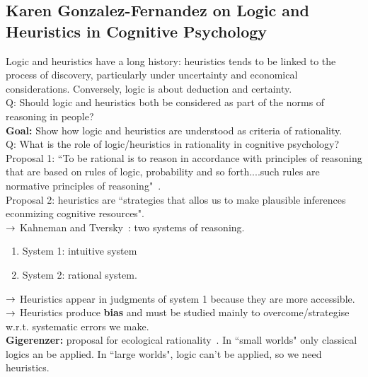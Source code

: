 \spacerule

\subsection{Karen Gonzalez-Fernandez on Logic
and Heuristics in Cognitive Psychology}

Logic and heuristics have a long history: heuristics tends to be linked to the process of discovery, particularly under uncertainty and economical considerations. Conversely, logic is about deduction and certainty. \\

Q: Should logic and heuristics both be considered as part of the norms of reasoning in people? \\

{\bf Goal:} Show how logic and heuristics are understood as criteria of rationality. \\

Q: What is the role of logic/heuristics in rationality in cognitive psychology?\\

Proposal 1: ``To be rational is to reason in accordance with principles of reasoning that are based on rules of logic, probability and so forth....such rules are normative principles of reasoning"~\cite{stein1996without}. \\

Proposal 2: heuristics are ``strategies that allos us to make plausible inferences econmizing cognitive resources". \\

$\rightarrow$ Kahneman and Tversky~\cite{kahneman2013prospect}: two systems of reasoning.
\begin{enumerate}
    \item System 1: intuitive system
    \item System 2: rational system.
\end{enumerate}

$\rightarrow$ Heuristics appear in judgments of system 1 because they are more accessible. \\

$\rightarrow$ Heuristics produce {\bf bias} and must be studied mainly to overcome/strategise w.r.t. systematic errors we make. \\

{\bf Gigerenzer:} proposal for ecological rationality~\cite{todd2012ecological}. In ``small worlds" only classical logics an be applied. In ``large worlds", logic can't be applied, so we need heuristics.

